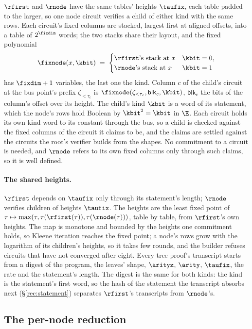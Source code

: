 $\rfirst$ and $\rnode$ have the same tables' heights $\taufix$, each table padded to the larger, so one node circuit verifies a child of either kind with the same rows. Each circuit's fixed columns are stacked, largest first at aligned offsets, into a table of $2^{\fixdim}$ words; the two stacks share their layout, and the fixed polynomial
\[
  \fixnode(x,\kbit)\;=\;\begin{cases}\text{$\rfirst$'s stack at $x$}&\kbit=0,\\\text{$\rnode$'s stack at $x$}&\kbit=1\end{cases}
\]
has $\fixdim+1$ variables, the last one the kind. Column $c$ of the child's circuit at the bus point's prefix $\zeta_{<\tau_c}$ is $\fixnode(\zeta_{<\tau_c},\mathsf{blk}_c,\kbit)$, $\mathsf{blk}_c$ the bits of the column's offset over its height. The child's kind $\kbit$ is a word of its statement, which the node's rows hold Boolean by $\kbit^2=\kbit$ in $\E$. Each circuit holds its own kind word to its constant through the bus, so a child is checked against the fixed columns of the circuit it claims to be, and the claims are settled against the circuits the root's verifier builds from the shapes. No commitment to a circuit is needed, and $\rnode$ refers to its own fixed columns only through such claims, so it is well defined.

\paragraph{The shared heights.} $\rfirst$ depends on $\taufix$ only through its statement's length; $\rnode$ verifies children of heights $\taufix$. The heights are the least fixed point of $\tau\mapsto\max(\tau,\tau(\rfirst(\tau)),\tau(\rnode(\tau)))$, table by table, from $\rfirst$'s own heights. The map is monotone and bounded by the heights one commitment holds, so Kleene iteration reaches the fixed point; a node's rows grow with the logarithm of its children's heights, so it takes few rounds, and the builder refuses circuits that have not converged after eight. Every tree proof's transcript starts from a digest of the program, the leaves' shape, $\arityz$, $\arity$, $\taufix$, the rate and the statement's length. The digest is the same for both kinds: the kind is the statement's first word, so the hash of the statement the transcript absorbs next (\S\ref{rec:statement}) separates $\rfirst$'s transcripts from $\rnode$'s.

\subsection{The per-node reduction}\label{rec:reduce}

